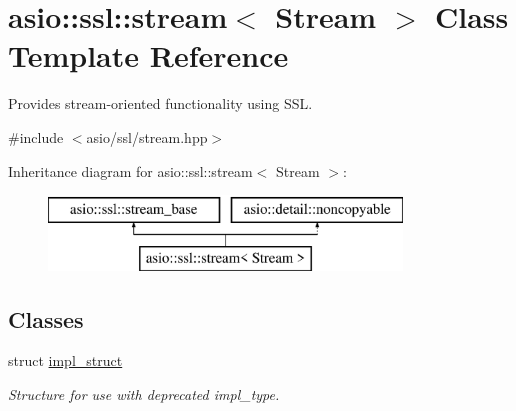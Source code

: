 \hypertarget{classasio_1_1ssl_1_1stream}{}\section{asio\+:\+:ssl\+:\+:stream$<$ Stream $>$ Class Template Reference}
\label{classasio_1_1ssl_1_1stream}


Provides stream-\/oriented functionality using S\+S\+L.  




{\ttfamily \#include $<$asio/ssl/stream.\+hpp$>$}

Inheritance diagram for asio\+:\+:ssl\+:\+:stream$<$ Stream $>$\+:\begin{figure}[H]
\begin{center}
\leavevmode
\includegraphics[height=2.000000cm]{classasio_1_1ssl_1_1stream}
\end{center}
\end{figure}
\subsection*{Classes}
\begin{DoxyCompactItemize}
\item 
struct \hyperlink{structasio_1_1ssl_1_1stream_1_1impl__struct}{impl\+\_\+struct}
\begin{DoxyCompactList}\small\item\em Structure for use with deprecated impl\+\_\+type. \end{DoxyCompactList}\end{DoxyCompactItemize}
